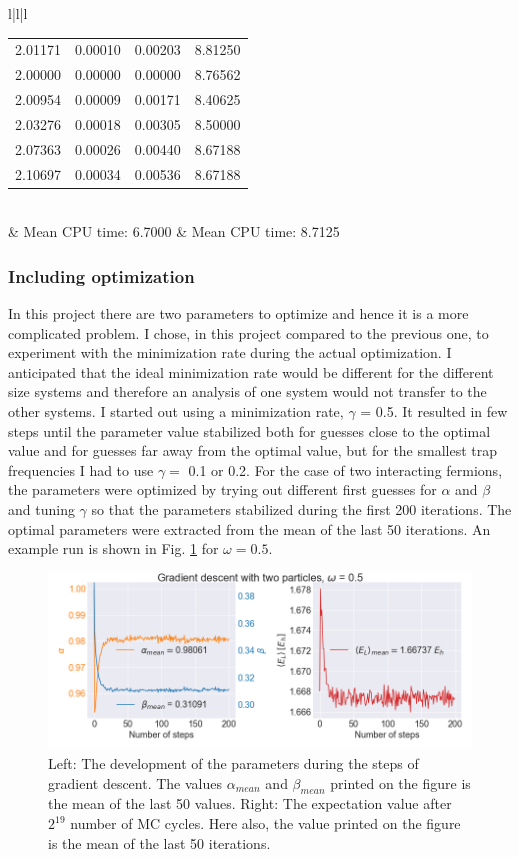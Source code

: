 \begin{table}[H]
\begin{tabular}{l|l|l}
\begin{tabular}{cccc}
2.01171 & 0.00010 & 0.00203 & 8.81250\\
2.00000 & 0.00000 & 0.00000 & 8.76562\\
2.00954 & 0.00009 & 0.00171 & 8.40625\\
2.03276 & 0.00018 & 0.00305 & 8.50000\\
2.07363 & 0.00026 & 0.00440 & 8.67188\\
2.10697 & 0.00034 & 0.00536 & 8.67188\\ \hline
\end{tabular}\\
& Mean CPU time:  6.7000 & Mean CPU time:  8.7125\\
\end{tabular}
\end{table}


\subsubsection{Including optimization}

In this project there are two parameters to optimize and hence it is a more complicated problem. I chose, in this project compared to the previous one, to experiment with the minimization rate during the actual optimization. I anticipated that the ideal minimization rate would be different for the different size systems and therefore an analysis of one system would not transfer to the other systems. I started out using a minimization rate, $\gamma$ = 0.5. It resulted in few steps until the parameter value stabilized both for guesses close to the optimal value and for guesses far away from the optimal value, but for the smallest trap frequencies I had to use $\gamma = $ 0.1 or 0.2. For the case of two interacting fermions, the parameters were optimized by trying out different first guesses for $\alpha$ and $\beta$ and tuning $\gamma$ so that the parameters stabilized during the first 200 iterations. The optimal parameters were extracted from the mean of the last 50 iterations. An example run is shown in Fig. \ref{fig:example_gradient_descent} for $\omega = 0.5$.

\begin{figure}[H]
\center
\includegraphics[width=0.8\linewidth]{../Results/example_gradient_descent}\caption{Left: The development of the parameters during the steps of gradient descent. The values $\alpha_{mean}$ and $\beta_{mean}$ printed on the figure is the mean of the last 50 values. Right: The expectation value after $2^{19}$ number of MC cycles. Here also, the value printed on the figure is the mean of the last 50 iterations. }\label{fig:example_gradient_descent}
\end{figure}

